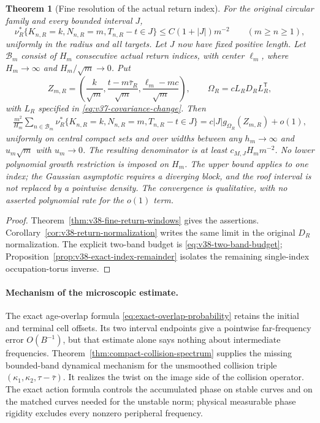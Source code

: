 \documentclass[11pt,reqno]{amsart}
\numberwithin{equation}{section}
\newtheorem{leadtheorem}{Theorem}
\theoremstyle{definition}\newtheorem{definition}[theorem]{Definition}
\theoremstyle{remark}\newtheorem{remark}[theorem]{Remark}
\begin{document}
\begin{leadtheorem}[Fine resolution of the actual return index]
\label{thm:intro-v38-fine-returns}
For the original circular family and every bounded interval $J$,
\[
 \nu_R^*\{K_{n,R}=k,N_{n,R}=m,T_{n,R}-t\in J\}
       \le C(1+|J|)m^{-2}\qquad(m\ge n\ge1),
\]
uniformly in the radius and all targets. Let $J$ now have fixed positive
length. Let $\mathcal B_m$ consist of $H_m$ consecutive actual return
indices, with center $\ell_m$, where $H_m\to\infty$ and
$H_m/\sqrt m\to0$. Put
\[
 Z_{m,R}=\left(\frac{k}{\sqrt m},
       \frac{t-m\bar\tau_R}{\sqrt m},
       \frac{\ell_m-mc}{\sqrt m}\right),\qquad
 \Omega_R=cL_RD_RL_R^{\mathsf T},
\]
with $L_R$ specified in \eqref{eq:v37-covariance-change}. Then
\begin{align}\label{eq:intro-v38-fine-returns}
 \frac{m^2}{H_m}\sum_{n\in\mathcal B_m}
 \nu_R^*\{K_{n,R}=k,N_{n,R}=m,T_{n,R}-t\in J\}
       =c|J|g_{\Omega_R}(Z_{m,R})+o(1),
\end{align}
uniformly on central compact sets and over widths between any
$h_m\to\infty$ and $u_m\sqrt m$ with $u_m\to0$.
The resulting denominator is at least $c_{M,J}H_mm^{-2}$.
No lower polynomial growth restriction is imposed on $H_m$.
The upper bound applies to one index; the Gaussian asymptotic requires
a diverging block, and the roof interval is not replaced by a pointwise
density. The convergence is qualitative, with no asserted polynomial
rate for the $o(1)$ term.
\end{leadtheorem}
\begin{proof}
Theorem~\ref{thm:v38-fine-return-windows} gives the assertions.
Corollary~\ref{cor:v38-return-normalization} writes the same limit in
the original $D_R$ normalization. The explicit two-band budget is
\eqref{eq:v38-two-band-budget};
Proposition~\ref{prop:v38-exact-index-remainder} isolates the remaining
single-index occupation-torus inverse.
\end{proof}

\paragraph{Mechanism of the microscopic estimate.}
The exact age-overlap formula
\eqref{eq:exact-overlap-probability} retains the initial and terminal
cell offsets. Its two interval endpoints give a pointwise far-frequency
error $O(B^{-1})$, but that estimate alone says nothing about intermediate
frequencies. Theorem~\ref{thm:compact-collision-spectrum} supplies the
missing bounded-band dynamical mechanism for the unsmoothed collision
triple $(\kappa_1,\kappa_2,\tau-\bar\tau)$. It realizes the twist on
the image side of the collision operator. The exact action formula
controls the accumulated phase on stable curves and on the matched
curves needed for the unstable norm; physical measurable phase rigidity
excludes every nonzero peripheral frequency.
\end{document}
